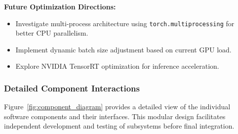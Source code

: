 \documentclass[12pt]{article}
\begin{document}
\textbf{Future Optimization Directions:}
\begin{itemize}
    \item Investigate multi-process architecture using \texttt{torch.multiprocessing} for better CPU parallelism.
    \item Implement dynamic batch size adjustment based on current GPU load.
    \item Explore NVIDIA TensorRT optimization for inference acceleration.
\end{itemize}

\subsubsection{Detailed Component Interactions}

Figure~\ref{fig:component_diagram} provides a detailed view of the individual software components and their interfaces. This modular design facilitates independent development and testing of subsystems before final integration.
\end{document}
